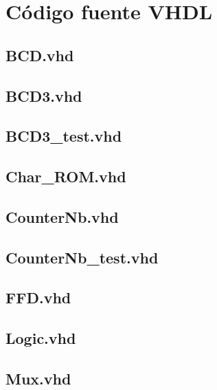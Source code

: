 \documentclass[10pt,spanish,a4paper,openany,notitlepage]{article}
\begin{document}
\newpage
\section{Código fuente VHDL}

\subsection{BCD.vhd}

\newpage

\subsection{BCD3.vhd}

\newpage

\subsection{BCD3\_test.vhd}

\newpage

\subsection{Char\_ROM.vhd}

\newpage

\subsection{CounterNb.vhd}

\newpage

\subsection{CounterNb\_test.vhd}

\newpage

\subsection{FFD.vhd}

\newpage

\subsection{Logic.vhd}

\newpage

\subsection{Mux.vhd}

\newpage
\end{document}
